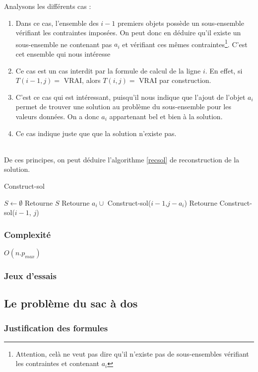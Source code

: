 Analysons les différents cas : \begin{enumerate}
	\item Dans ce cas, l'ensemble des $i-1$ premiers objets possède un sous-ensemble vérifiant les
		contraintes imposées. On peut donc en déduire qu'il existe un sous-ensemble ne contenant pas
		$a_i$ et vérifiant ces mêmes contraintes\footnote{Attention, celà ne veut pas dire qu'il
		n'existe pas de sous-ensembles vérifiant les contraintes et contenant $a_i$}. C'est cet ensemble
		qui nous intéresse
	\item Ce cas est un cas interdit par la formule de calcul de la ligne $i$. En effet, si $T(i-1, j)
		=$ VRAI, alors $T(i,j) =$ VRAI par construction.
	\item C'est ce cas qui est intéressant, puisqu'il nous indique que l'ajout de l'objet $a_i$ permet
		de trouver une solution au problème du sous-ensemble pour les valeurs données. On a donc $a_i$
		appartenant bel et bien à la solution.
	\item Ce cas indique juste que que la solution n'existe pas.
\end{enumerate}
~\\
De ces principes, on peut déduire l'algorithme \ref{recsol} de reconstruction de la solution.
\begin{algorithm}
	\caption{Construct-sol}
	\label{recsol}
	\begin{algorithmic}[1]
		\STATE $S \leftarrow \emptyset$
			\STATE Retourne $S$
		\ELSE
				\STATE Retourne $a_i \cup$ Construct-sol($i-1$,$j-a_i$)
			\ELSE
				\STATE Retourne Construct-sol($i-1$, $j$)
			\ENDIF
		\ENDIF
	\end{algorithmic}
\end{algorithm}


\subsubsection{Complexité}
$O(n.p_{max})$

\subsubsection{Jeux d'essais}


\subsection{Le problème du sac à dos}
\subsubsection{Justification des formules}

